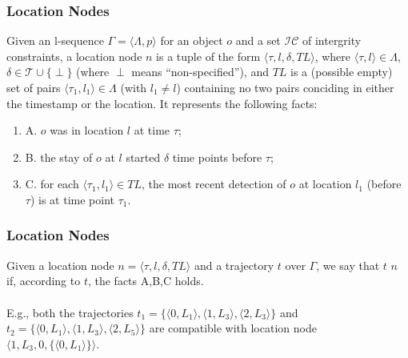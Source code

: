 \begin{frame}
\frametitle{Location Nodes}

\begin{definition}
  Given an l-sequence $\Gamma = \langle \Lambda,p \rangle$ for an object $o$ and a set $\mathcal{IC}$ of intergrity constraints, a location node $n$ is a tuple of the form $\langle \tau, l, \delta, TL \rangle$, where $\langle \tau, l \rangle \in \Lambda$, $\delta \in \mathcal{T} \cup \{ \perp \}$ (where $\perp$ means ``non-specified''), and $TL$ is a (possible empty) set of pairs $\langle \tau_1, l_1 \rangle \in \Lambda$ (with $l_1 \neq l$) containing no two pairs conciding in either the timestamp or the location. It represents the following facts:
  \begin{enumerate}
    \item A. $o$ was in location $l$ at time $\tau$;
    \item B. the stay of $o$ at $l$ started $\delta$ time points before $\tau$;
    \item C. for each $\langle \tau_1, l_1 \rangle \in TL$, the most recent detection of $o$ at location $l_1$ (before $\tau$) is at time point $\tau_1$.
  \end{enumerate}
\end{definition}

\end{frame}


\begin{frame}
\frametitle{Location Nodes}

Given a location node $n = \langle \tau, l, \delta, TL \rangle$ and a trajectory $t$ over $\Gamma$, we say that $t$  $n$ if, according to $t$, the facts A,B,C holds.\\~\\

E.g., both the trajectories $t_1 = \{ \langle 0,L_1 \rangle, \langle 1,L_3 \rangle, \langle 2,L_3 \rangle \}$ and $t_2 = \{ \langle 0,L_1 \rangle, \langle 1,L_3 \rangle, \langle 2,L_5 \rangle \}$ are compatible with location node $\langle 1, L_3, 0, \{ \langle 0, L_1 \rangle \} \rangle$.

\end{frame}


